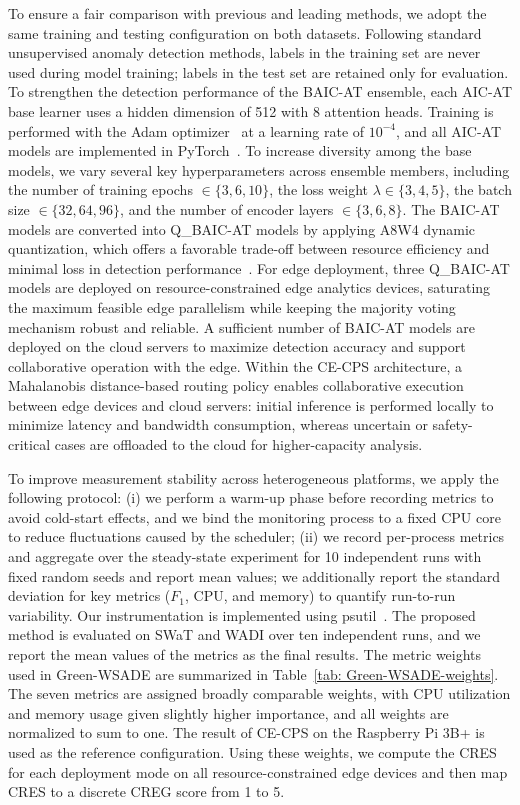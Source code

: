 \documentclass[pdflatex,sn-mathphys-num]{sn-jnl}%
\theoremstyle{thmstyleone}
\theoremstyle{thmstyletwo}%
\theoremstyle{thmstylethree}%
\begin{document}
To ensure a fair comparison with previous and leading methods, we adopt the same training and testing configuration on both datasets. Following standard unsupervised anomaly detection methods, labels in the training set are never used during model training; labels in the test set are retained only for evaluation. To strengthen the detection performance of the BAIC-AT ensemble, each AIC-AT base learner uses a hidden dimension of 512 with 8 attention heads. Training is performed with the Adam optimizer~\cite{kingma:adam} at a learning rate of $10^{-4}$, and all AIC-AT models are implemented in PyTorch~\cite{paszke2019pytorch}. To increase diversity among the base models, we vary several key hyperparameters across ensemble members, including the number of training epochs $\in \{3, 6, 10\}$, the loss weight $\lambda \in \{3, 4, 5\}$, the batch size $\in \{32, 64, 96\}$, and the number of encoder layers $\in \{3, 6, 8\}$. The BAIC-AT models are converted into Q\_BAIC-AT models by applying A8W4 dynamic quantization, which offers a favorable trade-off between resource efficiency and minimal loss in detection performance~\cite{wang2024low,dong2024eq}. For edge deployment, three Q\_BAIC-AT models are deployed on resource-constrained edge analytics devices, saturating the maximum feasible edge parallelism while keeping the majority voting mechanism robust and reliable. A sufficient number of BAIC-AT models are deployed on the cloud servers to maximize detection accuracy and support collaborative operation with the edge. Within the CE-CPS architecture, a Mahalanobis distance-based routing policy enables collaborative execution between edge devices and cloud servers: initial inference is performed locally to minimize latency and bandwidth consumption, whereas uncertain or safety-critical cases are offloaded to the cloud for higher-capacity analysis.

To improve measurement stability across heterogeneous platforms, we apply the following protocol: (i) we perform a warm-up phase before recording metrics to avoid cold-start effects, and we bind the monitoring process to a fixed CPU core to reduce fluctuations caused by the scheduler; (ii) we record per-process metrics and aggregate over the steady-state experiment for 10 independent runs with fixed random seeds and report mean values; we additionally report the standard deviation for key metrics ($F_1$, CPU, and memory) to quantify run-to-run variability. Our instrumentation is implemented using psutil~\cite{psutil_document}.
The proposed method is evaluated on SWaT and WADI over ten independent runs, and we report the mean values of the metrics as the final results. The metric weights used in Green-WSADE are summarized in Table~\ref{tab: Green-WSADE-weights}. The seven metrics are assigned broadly comparable weights, with CPU utilization and memory usage given slightly higher importance, and all weights are normalized to sum to one. The result of CE-CPS on the Raspberry Pi 3B+ is used as the reference configuration. Using these weights, we compute the CRES for each deployment mode on all resource-constrained edge devices and then map CRES to a discrete CREG score from 1 to 5.
\end{document}
